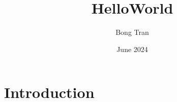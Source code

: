 \documentclass{article}
\title{HelloWorld}
\author{Bong Tran}
\date{June 2024}
\begin{document}
        
\maketitle
        
\section{Introduction}
        
\end{document}
